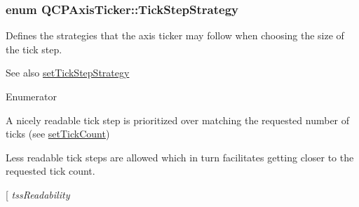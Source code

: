 \subsubsection[{\texorpdfstring{Tick\+Step\+Strategy}{TickStepStrategy}}]{\setlength{\rightskip}{0pt plus 5cm}enum {\bf Q\+C\+P\+Axis\+Ticker\+::\+Tick\+Step\+Strategy}}\hypertarget{class_q_c_p_axis_ticker_ab6d2f9d9477821623ac9bc4b21ddf49a}{}\label{class_q_c_p_axis_ticker_ab6d2f9d9477821623ac9bc4b21ddf49a}
Defines the strategies that the axis ticker may follow when choosing the size of the tick step.

\begin{DoxySeeAlso}{See also}
\hyperlink{class_q_c_p_axis_ticker_a73b1d847c1a12159af6bfda4ebebe7d5}{set\+Tick\+Step\+Strategy} 
\end{DoxySeeAlso}
\begin{Desc}
\item[Enumerator]\par
\begin{description}
\item[{\em 
tss\+Readability\hypertarget{class_q_c_p_axis_ticker_ab6d2f9d9477821623ac9bc4b21ddf49aa58661394415760a6eb2fd2f1e6604f40}{}\label{class_q_c_p_axis_ticker_ab6d2f9d9477821623ac9bc4b21ddf49aa58661394415760a6eb2fd2f1e6604f40}
}]A nicely readable tick step is prioritized over matching the requested number of ticks (see \hyperlink{class_q_c_p_axis_ticker_a47752abba8293e6dc18491501ae34008}{set\+Tick\+Count}) \item[{\em 
tss\+Meet\+Tick\+Count\hypertarget{class_q_c_p_axis_ticker_ab6d2f9d9477821623ac9bc4b21ddf49aa00554450d75d9741f6312a161c49a31f}{}\label{class_q_c_p_axis_ticker_ab6d2f9d9477821623ac9bc4b21ddf49aa00554450d75d9741f6312a161c49a31f}
}]Less readable tick steps are allowed which in turn facilitates getting closer to the requested tick count. \item[{\em 
tss\+Readability\hypertarget{class_q_c_p_axis_ticker_ab6d2f9d9477821623ac9bc4b21ddf49aa58661394415760a6eb2fd2f1e6604f40}{}\label{class_q_c_p_axis_ticker_ab6d2f9d9477821623ac9bc4b21ddf49aa58661394415760a6eb2fd2f1e6604f40}
}
\end{description}
\end{Desc}
